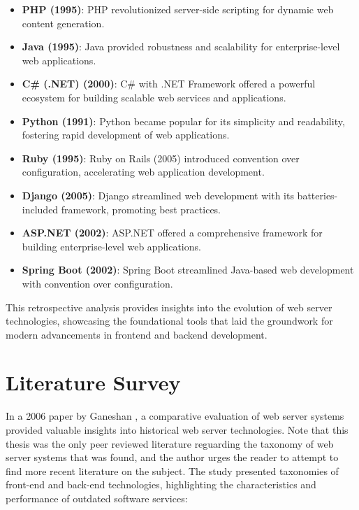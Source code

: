 \documentclass[conference]{IEEEtran}
\begin{document}
\begin{itemize}
    \item \textbf{PHP (1995)}: PHP revolutionized server-side scripting for dynamic web content generation.
    
    \item \textbf{Java (1995)}: Java provided robustness and scalability for enterprise-level web applications.
    
    \item \textbf{C\# (.NET) (2000)}: C\# with .NET Framework offered a powerful ecosystem for building scalable web services and applications.
    
    \item \textbf{Python (1991)}: Python became popular for its simplicity and readability, fostering rapid development of web applications.
    
    \item \textbf{Ruby (1995)}: Ruby on Rails (2005) introduced convention over configuration, accelerating web application development.
    
    \item \textbf{Django (2005)}: Django streamlined web development with its batteries-included framework, promoting best practices.
    
    \item \textbf{ASP.NET (2002)}: ASP.NET offered a comprehensive framework for building enterprise-level web applications.
    
    \item \textbf{Spring Boot (2002)}: Spring Boot streamlined Java-based web development with convention over configuration.

\end{itemize}

This retrospective analysis provides insights into the evolution of web server technologies, showcasing the foundational tools that laid the groundwork for modern advancements in frontend and backend development.



\section{Literature Survey}

In a 2006 paper by Ganeshan \cite{oldTaxonomy}, a comparative evaluation of web server systems provided valuable insights into historical web server technologies. Note that this thesis was the only peer reviewed literature reguarding the taxonomy of web server systems that was found, and the author urges the reader to attempt to find more recent literature on the subject. The study presented taxonomies of front-end and back-end technologies, highlighting the characteristics and performance of outdated software services:
\end{document}

